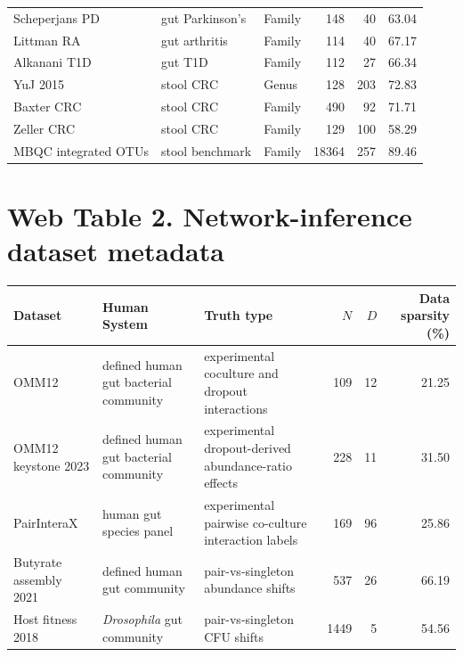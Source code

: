 \documentclass[11pt]{article}
\begin{document}
\begin{center}
\begin{tabular}{>{\raggedright\arraybackslash}p{}>{\raggedright\arraybackslash}p{}>{\raggedright\arraybackslash}p{}rrr}
Scheperjans PD & gut Parkinson's & Family & 148 & 40 & 63.04 \\
Littman RA & gut arthritis & Family & 114 & 40 & 67.17 \\
Alkanani T1D & gut T1D & Family & 112 & 27 & 66.34 \\
YuJ 2015 & stool CRC & Genus & 128 & 203 & 72.83 \\
Baxter CRC & stool CRC & Family & 490 & 92 & 71.71 \\
Zeller CRC & stool CRC & Family & 129 & 100 & 58.29 \\
MBQC integrated OTUs & stool benchmark & Family & 18364 & 257 & 89.46 \\
\bottomrule
\end{tabular}
\end{center}
\normalsize

\section*{Web Table 2. Network-inference dataset metadata}
\small
\begin{center}
\begin{tabular}{>{\raggedright\arraybackslash}p{}>{\raggedright\arraybackslash}p{}>{\raggedright\arraybackslash}p{}rrr}
\toprule
Dataset & Human System & Truth type & $N$ & $D$ & Data sparsity (\%) \\
\midrule
OMM12 & defined human gut bacterial community & experimental coculture and dropout interactions & 109 & 12 & 21.25 \\
OMM12 keystone 2023 & defined human gut bacterial community & experimental dropout-derived abundance-ratio effects & 228 & 11 & 31.50 \\
PairInteraX & human gut species panel & experimental pairwise co-culture interaction labels & 169 & 96 & 25.86 \\
Butyrate assembly 2021 & defined human gut community & pair-vs-singleton abundance shifts & 537 & 26 & 66.19 \\
Host fitness 2018 & \textit{Drosophila} gut community & pair-vs-singleton CFU shifts & 1449 & 5 & 54.56 \\
\bottomrule
\end{tabular}
\end{center}
\normalsize
\end{document}
